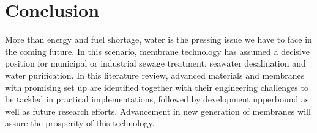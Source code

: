 \documentclass[a4paper,12pt]{report}
\begin{document}
\chapter{Conclusion}

More than energy and fuel shortage, water is the pressing issue we have to face in the coming future. In this scenario, membrane technology has assumed a decisive position for municipal or industrial sewage treatment, seawater desalination and water purification. In this literature review, advanced materials and membranes with promising set up are identified together with their engineering challenges to be tackled in practical implementations, followed by development upperbound as well as future research efforts. Advancement in new generation of membranes will assure the prosperity of this technology. 
\newpage


\clearpage
{}
{}



\end{document}
